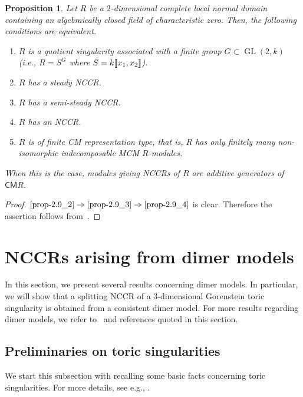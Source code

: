 \documentclass[11pt]{amsart}
\newtheorem{prop}[theo]{Proposition}
\theoremstyle{definition}
\DeclareMathOperator{\GL}{GL}
\newcommand{\CM}{\mathsf{CM}}
\newcommand{\llbracket}{\mathopen{[\mkern -2.7mu[}}
\newcommand{\rrbracket}{\mathclose{]\mkern -2.7mu]}}
\begin{document}
\begin{prop}\label{twodim}
Let $R$ be a $2$-dimensional complete local normal domain containing an algebraically closed field of characteristic zero. Then, the following conditions are equivalent.
\begin{enumerate}%
\item\label{prop-2.9_1} $R$ is a quotient singularity associated with a finite group $G\subset\GL(2, k)$ (i.e., $R=S^G$ where $S=k\llbracket x_1, x_2\rrbracket $).
\item\label{prop-2.9_2} $R$ has a steady NCCR.
\item\label{prop-2.9_3} $R$ has a semi-steady NCCR.
\item\label{prop-2.9_4} $R$ has an NCCR.
\item\label{prop-2.9_5} $R$ is of finite CM representation type, that is, $R$ has only finitely many non-isomorphic indecomposable MCM $R$-modules.
\end{enumerate}
When this is the case, modules giving NCCRs of $R$ are additive generators of $\CM R$.
\end{prop}

\begin{proof}
$\eqref{prop-2.9_2}\Rightarrow\eqref{prop-2.9_3}\Rightarrow\eqref{prop-2.9_4}$ is clear. Therefore the assertion follows from~\cite[Proposition~4.2]{IN}.
\end{proof}


\section{NCCRs arising from dimer models}\label{NCCR_via_dimer}

In this section, we present several results concerning dimer models. In particular, we will show that a splitting NCCR of a $3$-dimensional Gorenstein toric singularity is obtained from a consistent dimer model. For more results regarding dimer models, we refer to~\cite{Boc4} and references quoted in this section.

\subsection{Preliminaries on toric singularities}\label{toric_pre}
We start this subsection with recalling some basic facts concerning toric singularities. For more details, see e.g., \cite{BG2,CLS}.
\end{document}

